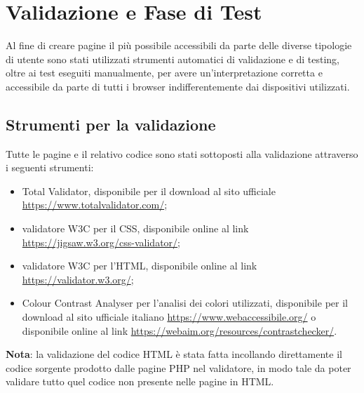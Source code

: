 \section{Validazione e Fase di Test}
Al fine di creare pagine il più possibile accessibili da parte delle diverse tipologie di utente sono stati utilizzati strumenti automatici di validazione e di testing, oltre ai test eseguiti manualmente, per avere un'interpretazione corretta e accessibile da parte di tutti i browser indifferentemente dai dispositivi utilizzati.

\subsection{Strumenti per la validazione}
Tutte le pagine e il relativo codice sono stati sottoposti alla validazione attraverso i seguenti strumenti:
\begin{itemize}
	\item Total Validator, disponibile per il download al sito ufficiale \url{https://www.totalvalidator.com/};
	\item validatore W3C per il CSS, disponibile online al link \url{https://jigsaw.w3.org/css-validator/};
	\item validatore W3C per l'HTML, disponibile online al link \url{https://validator.w3.org/};
	\item Colour Contrast Analyser per l'analisi dei colori utilizzati, disponibile per il download al sito ufficiale italiano \url{https://www.webaccessibile.org/} o disponibile online al link \url{https://webaim.org/resources/contrastchecker/}.
\end{itemize}
\textbf{Nota}: la validazione del codice HTML è stata fatta incollando direttamente il codice sorgente prodotto dalle pagine PHP nel validatore, in modo tale da poter validare tutto quel codice non presente nelle pagine in HTML.

